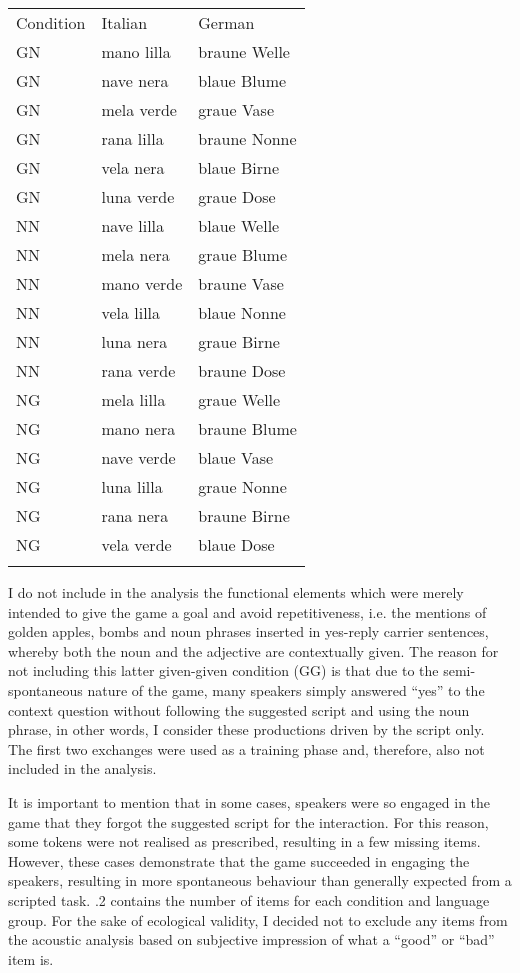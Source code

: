 \begin{tabularx}{\textwidth}{XXX}

\lsptoprule

Condition & Italian & German\\
GN & mano lilla & braune Welle\\
GN & nave nera & blaue Blume\\
GN & mela verde & graue Vase\\
GN & rana lilla & braune Nonne\\
GN & vela nera & blaue Birne\\
GN & luna verde & graue Dose\\
NN & nave lilla & blaue Welle\\
NN & mela nera & graue Blume\\
NN & mano verde & braune Vase\\
NN & vela lilla & blaue Nonne\\
NN & luna nera & graue Birne\\
NN & rana verde & braune Dose\\
NG & mela lilla & graue Welle\\
NG & mano nera & braune Blume\\
NG & nave verde & blaue Vase\\
NG & luna lilla & graue Nonne\\
NG & rana nera & braune Birne\\
NG & vela verde & blaue Dose\\
\lspbottomrule
\end{tabularx}
I do not include in the analysis the functional elements which were merely intended to give the game a goal and avoid repetitiveness, i.e. the mentions of golden apples, bombs and noun phrases inserted in yes-reply carrier sentences, whereby both the noun and the adjective are contextually given. The reason for not including this latter given-given condition (GG) is that due to the semi-spontaneous nature of the game, many speakers simply answered “yes” to the context question without following the suggested script and using the noun phrase, in other words, I consider these productions driven by the script only. The first two exchanges were used as a training phase and, therefore, also not included in the analysis.

It is important to mention that in some cases, speakers were so engaged in the game that they forgot the suggested script for the interaction. For this reason, some tokens were not realised as prescribed, resulting in a few missing items. However, these cases demonstrate that the game succeeded in engaging the speakers, resulting in more spontaneous behaviour than generally expected from a scripted task. .2 contains the number of items for each condition and language group. For the sake of ecological validity, I decided not to exclude any items from the acoustic analysis based on subjective impression of what a “good” or “bad” item is.

